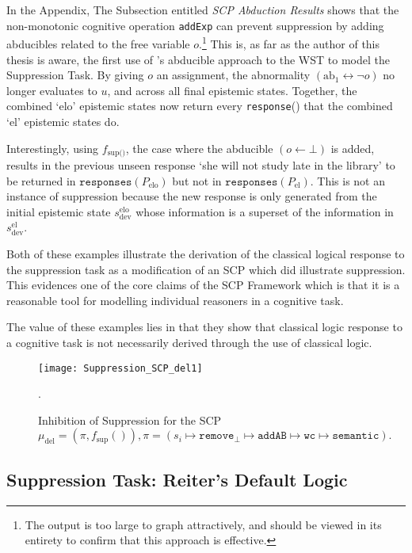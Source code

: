 In the Appendix, The Subsection entitled \textit{SCP Abduction Results} shows that the non-monotonic cognitive operation \texttt{addExp} can prevent suppression by adding abducibles related to the  free variable $o$.\footnote{The output is too large to graph attractively, and should be viewed in its entirety to confirm that this approach is effective.} This is, as far as the author of this thesis is aware, the first use of \cite{holldobler2015weak}'s abducible approach to the WST to model the Suppression Task. By giving $o$ an assignment, the abnormality $(\text{ab}_1\leftrightarrow \lnot o)$ no longer evaluates to $u$, and across all final epistemic states. Together, the combined `elo' epistemic states now return every \texttt{response}() that the combined `el' epistemic states do. 

Interestingly, using $f_\text{sup()}$, the case where the abducible $(o \leftarrow \bot)$ is added, results in the previous unseen response `she will not study late in the library' to be returned in $\texttt{responses}(P_\text{elo})$ but not in $\texttt{responses}(P_\text{el})$. This is not an instance of suppression because the new response is only generated from the initial epistemic state $s_\text{dev}^\text{elo}$ whose information is a superset of the information in $s_\text{dev}^\text{el}$.

Both of these examples illustrate the derivation of the classical logical response to the suppression task as a modification of an SCP which did illustrate suppression. This evidences one of the core claims of the SCP Framework which is that it is a reasonable tool for modelling individual reasoners in a cognitive task. 

The value of these examples lies in that they show that classical logic response to a cognitive task is not necessarily derived through the use of classical logic.

\begin{figure}
\centering \texttt{[image: Suppression\_SCP\_del1]}
\caption{Inhibition of Suppression for the SCP $\mu_\text{del}=(\pi,f_\text{sup}()), \pi = (s_i \longmapsto \texttt{remove}_\bot \longmapsto \texttt{addAB} \longmapsto \texttt{wc} \longmapsto \texttt{semantic}).$}.
\label{fig:Suppression_SCP_del1}
\end{figure}




\subsection{Suppression Task: Reiter's Default Logic}

